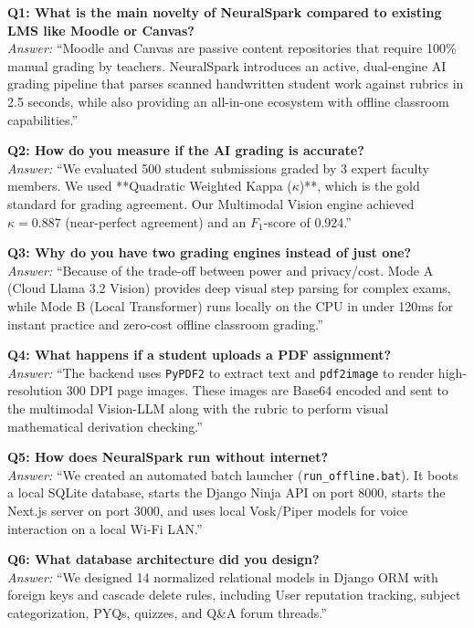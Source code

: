 \documentclass[11pt,a4paper]{article}
\begin{document}
\textbf{Q1: What is the main novelty of NeuralSpark compared to existing LMS like Moodle or Canvas?}\\
\textit{Answer:} ``Moodle and Canvas are passive content repositories that require 100\% manual grading by teachers. NeuralSpark introduces an active, dual-engine AI grading pipeline that parses scanned handwritten student work against rubrics in 2.5 seconds, while also providing an all-in-one ecosystem with offline classroom capabilities.''

\textbf{Q2: How do you measure if the AI grading is accurate?}\\
\textit{Answer:} ``We evaluated 500 student submissions graded by 3 expert faculty members. We used **Quadratic Weighted Kappa ($\kappa$)**, which is the gold standard for grading agreement. Our Multimodal Vision engine achieved $\kappa = 0.887$ (near-perfect agreement) and an $F_1$-score of 0.924.''

\textbf{Q3: Why do you have two grading engines instead of just one?}\\
\textit{Answer:} ``Because of the trade-off between power and privacy/cost. Mode A (Cloud Llama 3.2 Vision) provides deep visual step parsing for complex exams, while Mode B (Local Transformer) runs locally on the CPU in under 120ms for instant practice and zero-cost offline classroom grading.''

\textbf{Q4: What happens if a student uploads a PDF assignment?}\\
\textit{Answer:} ``The backend uses \texttt{PyPDF2} to extract text and \texttt{pdf2image} to render high-resolution 300 DPI page images. These images are Base64 encoded and sent to the multimodal Vision-LLM along with the rubric to perform visual mathematical derivation checking.''

\textbf{Q5: How does NeuralSpark run without internet?}\\
\textit{Answer:} ``We created an automated batch launcher (\texttt{run\_offline.bat}). It boots a local SQLite database, starts the Django Ninja API on port 8000, starts the Next.js server on port 3000, and uses local Vosk/Piper models for voice interaction on a local Wi-Fi LAN.''

\textbf{Q6: What database architecture did you design?}\\
\textit{Answer:} ``We designed 14 normalized relational models in Django ORM with foreign keys and cascade delete rules, including User reputation tracking, subject categorization, PYQs, quizzes, and Q\&A forum threads.''
\end{document}
